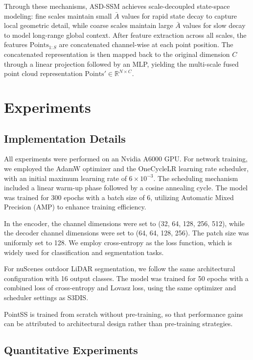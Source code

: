 \documentclass[a4paper,fleqn]{cas-sc}
\begin{document}
Through these mechanisms, ASD-SSM achieves scale-decoupled state-space modeling: fine scales maintain small $\bar{A}$ values for rapid state decay to capture local geometric detail, while coarse scales maintain large $\bar{A}$ values for slow decay to model long-range global context. After feature extraction across all scales, the features $\text{Points}_{1:S}$ are concatenated channel-wise at each point position. The concatenated representation is then mapped back to the original dimension $C$ through a linear projection followed by an MLP, yielding the multi-scale fused point cloud representation $\text{Points}' \in \mathbb{R}^{N \times C}$.

\section{Experiments}\label{sec:experiment}

\subsection{Implementation Details}

All experiments were performed on an Nvidia A6000 GPU. For network training, we employed the AdamW optimizer and the OneCycleLR learning rate scheduler, with an initial maximum learning rate of $6 \times 10^{-3}$. The scheduling mechanism included a linear warm-up phase followed by a cosine annealing cycle. The model was trained for 300 epochs with a batch size of 6, utilizing Automatic Mixed Precision (AMP) to enhance training efficiency.

In the encoder, the channel dimensions were set to (32, 64, 128, 256, 512), while the decoder channel dimensions were set to (64, 64, 128, 256). The patch size was uniformly set to 128. We employ cross-entropy as the loss function, which is widely used for classification and segmentation tasks.

For nuScenes outdoor LiDAR segmentation, we follow the same architectural configuration with 16 output classes. The model was trained for 50 epochs with a combined loss of cross-entropy and Lovasz loss, using the same optimizer and scheduler settings as S3DIS.

PointSS is trained from scratch without pre-training, so that performance gains can be attributed to architectural design rather than pre-training strategies.

\subsection{Quantitative Experiments}
\end{document}
